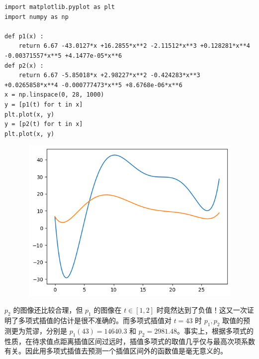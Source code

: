 \documentclass{ctexart}
\begin{document}
\begin{verbatim}
import matplotlib.pyplot as plt
import numpy as np

def p1(x) :
    return 6.67 -43.0127*x +16.2855*x**2 -2.11512*x**3 +0.128281*x**4 -0.00371557*x**5 +4.1477e-05*x**6
def p2(x) :
    return 6.67 -5.85018*x +2.98227*x**2 -0.424283*x**3 +0.0265858*x**4 -0.000777473*x**5 +8.6768e-06*x**6
x = np.linspace(0, 28, 1000)
y = [p1(t) for t in x]
plt.plot(x, y)
y = [p2(t) for t in x]
plt.plot(x, y)
\end{verbatim}

\begin{figure}[h]
    \begin{minipage}{4cm}
	\includegraphics[width = 12cm, height = 8cm]{5.png}
	\label{fig2}
	\end{minipage}
\end{figure}

$p_2$ 的图像还比较合理，但 $p_1$ 的图像在 $t\in [1,2]$ 时竟然达到了负值！这又一次证明了多项式插值的估计是很不准确的。而多项式插值对 $t=43$ 时 $p_1,p_2$ 取值的预测更为荒谬，分别是 $p_1(43)=14640.3$ 和 $p_2=2981.48$。事实上，根据多项式的性质，在待求值点距离插值区间过远时，插值多项式的取值几乎仅与最高次项系数有关。因此用多项式插值去预测一个插值区间外的函数值是毫无意义的。
\end{document}
